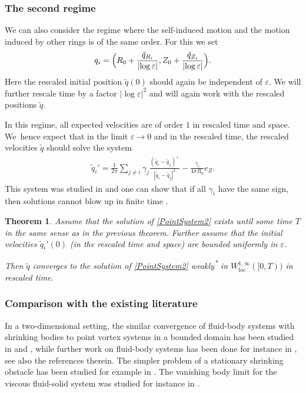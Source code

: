\documentclass[10pt]{amsart}
\let\epsilon\varepsilon
\newcommand{\loc}{\mathrm{loc}}
\newtheorem{theorem}{Theorem}[subsection]
\theoremstyle{definition}
\renewcommand\star{\textsuperscript{*} }
\newcommand\eq{=}
\let\eps\epsilon
\begin{document}
\subsubsection{The second regime}

We can also consider the regime where the self-induced motion and the motion induced by other rings is of the same order. For this we set
\begin{align}\label{def regime2}
q_i\eq \Bigl(R_0+\frac{\tilde{q}_{R_i}}{|{\log\eps}|},Z_0+\frac{\tilde{q}_{Z_i}}{|{\log\eps}|}\Bigr).
\end{align}
Here the rescaled initial position $\tilde{q}(0)$ should again be independent of $\eps$.
We will further rescale time by a factor $|{\log\eps}|^2$ and will again work with the rescaled positions $\tilde{q}$.

In this regime, all expected velocities are of order $1$ in rescaled time and space.
We~hence expect that in the limit $\eps\to 0$ and in the rescaled time, the rescaled velocities $\tilde{q}$ should solve the system
\begin{align}\label{PointSystem2}
\tilde{q}_i'\eq\frac{1}{2\pi}\sum_{j\neq i}\gamma_j\frac{(\tilde{q}_i-\tilde{q}_j)^\perp}{|\tilde{q}_i-\tilde{q}_j|^2}-\frac{\gamma_i}{4\pi R_0}e_Z.
\end{align}
This system was studied in \cite{MarchioroNegrini2} and one can show that if all $\gamma_i$ have the same sign, then solutions cannot blow up in finite time \cite[Th.\,2.1]{MarchioroNegrini2}.


\begin{theorem}\label{Limit2}
Assume that the solution of \eqref{PointSystem2} exists until some time $T$ in the same sense as in the previous theorem. Further assume that the initial velocities $\tilde{q}{}_i'(0)$ (in the rescaled time and space) are bounded uniformly in $\eps$.

Then $\tilde{q}$ converges to the solution of \eqref{PointSystem2} weakly\star in $W_{\loc}^{1,\infty}([0,T))$ in rescaled time.
\end{theorem}


\subsubsection*{Comparison with the existing literature}
In a two-dimensional setting, the similar convergence of fluid-body systems with shrinking bodies to point vortex systems in a bounded domain has been studied in \cite{GlassMunnierSueur1} and \cite{GlassSueur3}, while further work on fluid-body systems has been done for instance in \cite{GlassMunnierSueur2,glass2015uniqueness,HouotMunnier4,Munnier5}, see also the references therein. The simpler problem of a stationary shrinking obstacle has been studied for example in \cite{he2019small,iftimie2003two,iftimie2009incompressible}. The vanishing body limit for the viscous fluid-solid system was studied for instance in \cite{he2024vanishing,lacave2017small}.
\end{document}
